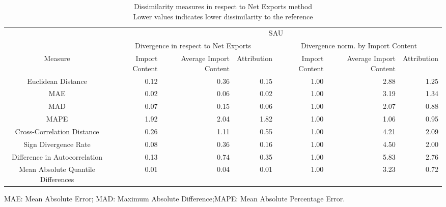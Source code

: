 \begin{table}[t]
\caption*{
{\large Dissimilarity measures in respect to Net Exports method} \\ 
{\small Lower values indicates lower dissimilarity to the reference}
} 
\fontsize{15.0pt}{18.0pt}\selectfont
\begin{tabular*}{\linewidth}{@{\extracolsep{\fill}}crrrrrr}
\toprule
 & \multicolumn{6}{c}{SAU} \\ 
\cmidrule(lr){2-7}
 & \multicolumn{3}{c}{Divergence in respect to Net Exports} & \multicolumn{3}{c}{Divergence norm. by Import Content} \\ 
\cmidrule(lr){2-4} \cmidrule(lr){5-7}
Measure & Import Content & Average Import Content & Attribution & Import Content & Average Import Content & Attribution \\ 
\midrule\addlinespace[2.5pt]
Euclidean Distance & 0.12 & 0.36 & 0.15 & 1.00 & 2.88 & 1.25 \\ 
MAE & 0.02 & 0.06 & 0.02 & 1.00 & 3.19 & 1.34 \\ 
MAD & 0.07 & 0.15 & 0.06 & 1.00 & 2.07 & 0.88 \\ 
MAPE & 1.92 & 2.04 & 1.82 & 1.00 & 1.06 & 0.95 \\ 
Cross-Correlation Distance & 0.26 & 1.11 & 0.55 & 1.00 & 4.21 & 2.09 \\ 
Sign Divergence Rate & 0.08 & 0.36 & 0.16 & 1.00 & 4.50 & 2.00 \\ 
Difference in Autocorrelation & 0.13 & 0.74 & 0.35 & 1.00 & 5.83 & 2.76 \\ 
Mean Absolute Quantile Differences & 0.01 & 0.04 & 0.01 & 1.00 & 3.23 & 0.72 \\ 
\bottomrule
\end{tabular*}
\begin{minipage}{\linewidth}
MAE: Mean Absolute Error; MAD: Maximum Absolute Difference;MAPE: Mean Absolute Percentage Error.\\
\end{minipage}
\end{table}

